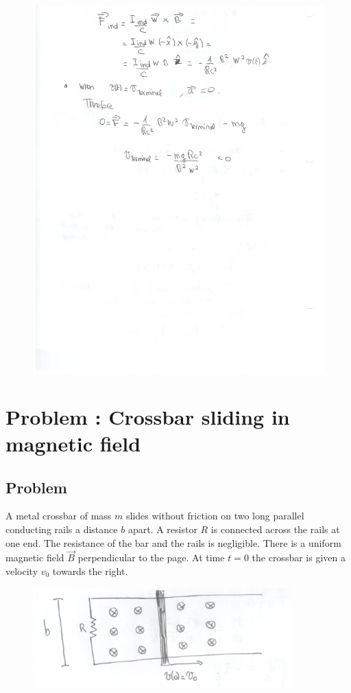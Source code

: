 \documentclass[solutions]{esg8022pset}
\begin{document}
    \begin{figure}[H]
    \centering
    \includegraphics{ps9_1b}
  \end{figure}
\section{Problem \thesection: Crossbar sliding in magnetic field}
\subsection{Problem}
A metal crossbar of mass $m$ slides without friction on two long parallel conducting rails a distance $b$ apart.
A resistor $R$ is connected across the rails at one end. The resistance of the bar and the rails is negligible.
There is a uniform magnetic field $\vec{B}$ perpendicular to the page. At time $t=0$ the crossbar is given a velocity
$v_0$ towards the right.

  \begin{figure}[H]
    \centering
    \includegraphics[width = 10cm]{crossbar}
    \label{fig:crossbar}
  \end{figure}
\end{document}
